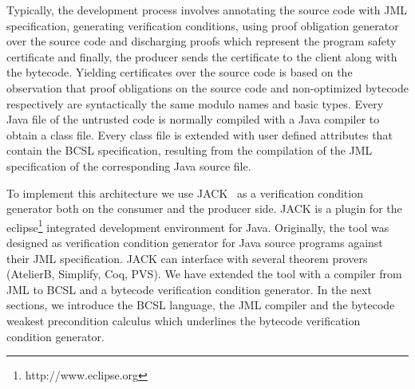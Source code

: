 Typically, the development process involves annotating the source code with JML specification,
 generating verification conditions, using proof obligation generator over the source code and 
discharging proofs which represent the program safety certificate and finally, the producer sends the certificate to the client along with the bytecode.
 Yielding certificates over the source code is based on the observation that
 proof obligations on the source code and non-optimized bytecode respectively
 are syntactically the same modulo names and basic types. Every Java file of the 
untrusted code is normally compiled with a Java compiler to obtain a class file. Every class file is extended with
 user defined attributes that contain the BCSL specification, resulting from the compilation of the
 JML specification of the corresponding Java source file.



    





To implement this architecture we use JACK~\cite{BRL-JACK} as a verification condition generator both on the consumer and the
producer side. JACK is a plugin for the eclipse\footnote{http://www.eclipse.org} integrated development environment for Java.
 Originally, the tool was designed as verification condition generator for Java source programs against their JML specification.
 JACK can interface with several theorem provers (AtelierB, Simplify, Coq, PVS). We have extended the tool with a compiler from
 JML to BCSL and a bytecode verification condition generator. In the next sections, we introduce
 the BCSL language, the JML compiler and the bytecode weakest precondition calculus which underlines the bytecode verification condition generator.
 
